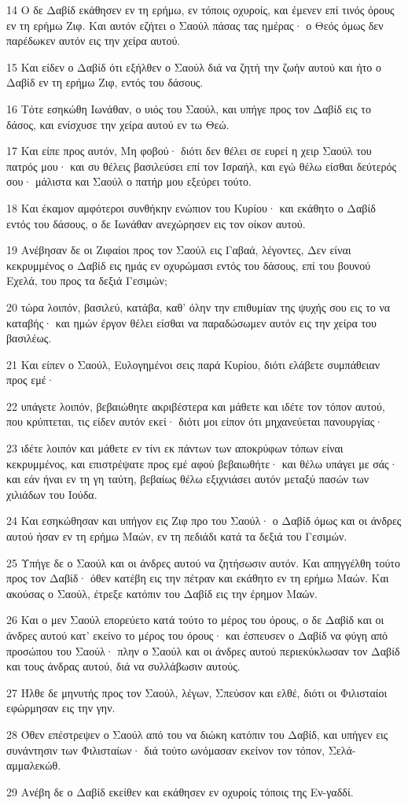 \par 14 Ο δε Δαβίδ εκάθησεν εν τη ερήμω, εν τόποις οχυροίς, και έμενεν επί τινός όρους εν τη ερήμω Ζιφ. Και αυτόν εζήτει ο Σαούλ πάσας τας ημέρας· ο Θεός όμως δεν παρέδωκεν αυτόν εις την χείρα αυτού.
\par 15 Και είδεν ο Δαβίδ ότι εξήλθεν ο Σαούλ διά να ζητή την ζωήν αυτού και ήτο ο Δαβίδ εν τη ερήμω Ζιφ, εντός του δάσους.
\par 16 Τότε εσηκώθη Ιωνάθαν, ο υιός του Σαούλ, και υπήγε προς τον Δαβίδ εις το δάσος, και ενίσχυσε την χείρα αυτού εν τω Θεώ.
\par 17 Και είπε προς αυτόν, Μη φοβού· διότι δεν θέλει σε ευρεί η χειρ Σαούλ του πατρός μου· και συ θέλεις βασιλεύσει επί τον Ισραήλ, και εγώ θέλω είσθαι δεύτερός σου· μάλιστα και Σαούλ ο πατήρ μου εξεύρει τούτο.
\par 18 Και έκαμον αμφότεροι συνθήκην ενώπιον του Κυρίου· και εκάθητο ο Δαβίδ εντός του δάσους, ο δε Ιωνάθαν ανεχώρησεν εις τον οίκον αυτού.
\par 19 Ανέβησαν δε οι Ζιφαίοι προς τον Σαούλ εις Γαβαά, λέγοντες, Δεν είναι κεκρυμμένος ο Δαβίδ εις ημάς εν οχυρώμασι εντός του δάσους, επί του βουνού Εχελά, του προς τα δεξιά Γεσιμών;
\par 20 τώρα λοιπόν, βασιλεύ, κατάβα, καθ' όλην την επιθυμίαν της ψυχής σου εις το να καταβής· και ημών έργον θέλει είσθαι να παραδώσωμεν αυτόν εις την χείρα του βασιλέως.
\par 21 Και είπεν ο Σαούλ, Ευλογημένοι σεις παρά Κυρίου, διότι ελάβετε συμπάθειαν προς εμέ·
\par 22 υπάγετε λοιπόν, βεβαιώθητε ακριβέστερα και μάθετε και ιδέτε τον τόπον αυτού, που κρύπτεται, τις είδεν αυτόν εκεί· διότι μοι είπον ότι μηχανεύεται πανουργίας·
\par 23 ιδέτε λοιπόν και μάθετε εν τίνι εκ πάντων των αποκρύφων τόπων είναι κεκρυμμένος, και επιστρέψατε προς εμέ αφού βεβαιωθήτε· και θέλω υπάγει με σάς· και εάν ήναι εν τη γη ταύτη, βεβαίως θέλω εξιχνιάσει αυτόν μεταξύ πασών των χιλιάδων του Ιούδα.
\par 24 Και εσηκώθησαν και υπήγον εις Ζιφ προ του Σαούλ· ο Δαβίδ όμως και οι άνδρες αυτού ήσαν εν τη ερήμω Μαών, εν τη πεδιάδι κατά τα δεξιά του Γεσιμών.
\par 25 Υπήγε δε ο Σαούλ και οι άνδρες αυτού να ζητήσωσιν αυτόν. Και απηγγέλθη τούτο προς τον Δαβίδ· όθεν κατέβη εις την πέτραν και εκάθητο εν τη ερήμω Μαών. Και ακούσας ο Σαούλ, έτρεξε κατόπιν του Δαβίδ εις την έρημον Μαών.
\par 26 Και ο μεν Σαούλ επορεύετο κατά τούτο το μέρος του όρους, ο δε Δαβίδ και οι άνδρες αυτού κατ' εκείνο το μέρος του όρους· και έσπευσεν ο Δαβίδ να φύγη από προσώπου του Σαούλ· πλην ο Σαούλ και οι άνδρες αυτού περιεκύκλωσαν τον Δαβίδ και τους άνδρας αυτού, διά να συλλάβωσιν αυτούς.
\par 27 Ήλθε δε μηνυτής προς τον Σαούλ, λέγων, Σπεύσον και ελθέ, διότι οι Φιλισταίοι εφώρμησαν εις την γην.
\par 28 Όθεν επέστρεψεν ο Σαούλ από του να διώκη κατόπιν του Δαβίδ, και υπήγεν εις συνάντησιν των Φιλισταίων· διά τούτο ωνόμασαν εκείνον τον τόπον, Σελά-αμμαλεκώθ.
\par 29 Ανέβη δε ο Δαβίδ εκείθεν και εκάθησεν εν οχυροίς τόποις της Εν-γαδδί.

